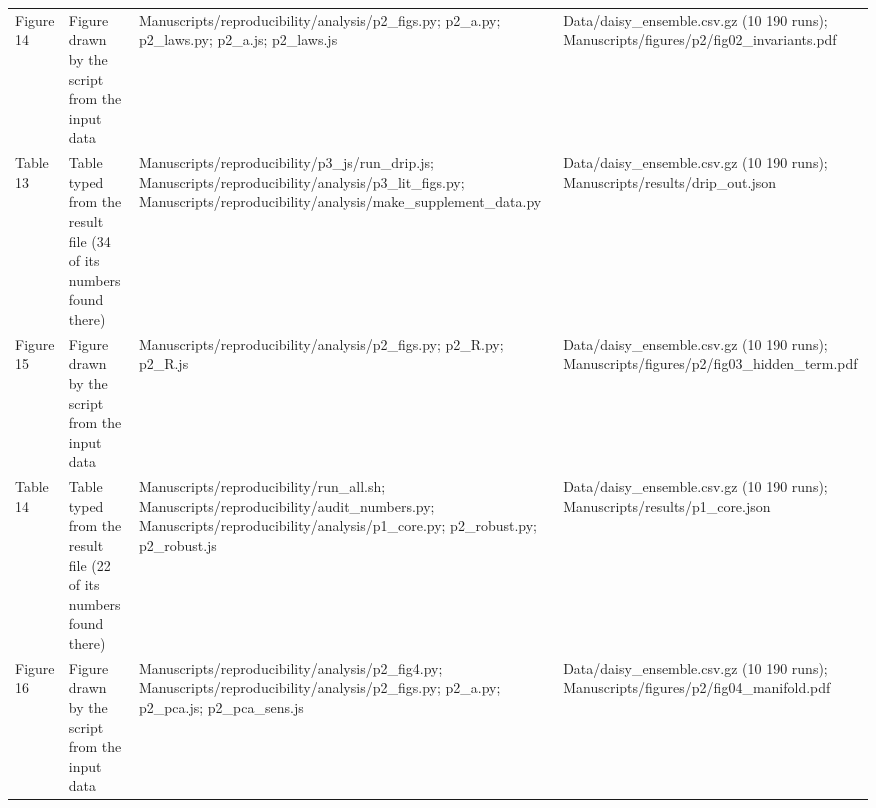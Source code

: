 {\begin{longtable}{p{}p{}p{}p{}}
{}Figure 14 & Figure drawn by the script from the input data & Manuscripts/\allowbreak{}reproducibility/\allowbreak{}analysis/\allowbreak{}p2\_\allowbreak{}figs.py;  p2\_\allowbreak{}a.py;  p2\_\allowbreak{}laws.py;  p2\_\allowbreak{}a.js;  p2\_\allowbreak{}laws.js & Data/\allowbreak{}daisy\_\allowbreak{}ensemble.csv.gz (10 190 runs);  Manuscripts/\allowbreak{}figures/\allowbreak{}p2/\allowbreak{}fig02\_\allowbreak{}invariants.pdf\\
{}Table 13 & Table typed from the result file (34 of its numbers found there) & Manuscripts/\allowbreak{}reproducibility/\allowbreak{}p3\_\allowbreak{}js/\allowbreak{}run\_\allowbreak{}drip.js;  Manuscripts/\allowbreak{}reproducibility/\allowbreak{}analysis/\allowbreak{}p3\_\allowbreak{}lit\_\allowbreak{}figs.py;  Manuscripts/\allowbreak{}reproducibility/\allowbreak{}analysis/\allowbreak{}make\_\allowbreak{}supplement\_\allowbreak{}data.py & Data/\allowbreak{}daisy\_\allowbreak{}ensemble.csv.gz (10 190 runs);  Manuscripts/\allowbreak{}results/\allowbreak{}drip\_\allowbreak{}out.json\\
{}Figure 15 & Figure drawn by the script from the input data & Manuscripts/\allowbreak{}reproducibility/\allowbreak{}analysis/\allowbreak{}p2\_\allowbreak{}figs.py;  p2\_\allowbreak{}R.py;  p2\_\allowbreak{}R.js & Data/\allowbreak{}daisy\_\allowbreak{}ensemble.csv.gz (10 190 runs);  Manuscripts/\allowbreak{}figures/\allowbreak{}p2/\allowbreak{}fig03\_\allowbreak{}hidden\_\allowbreak{}term.pdf\\
{}Table 14 & Table typed from the result file (22 of its numbers found there) & Manuscripts/\allowbreak{}reproducibility/\allowbreak{}run\_\allowbreak{}all.sh;  Manuscripts/\allowbreak{}reproducibility/\allowbreak{}audit\_\allowbreak{}numbers.py;  Manuscripts/\allowbreak{}reproducibility/\allowbreak{}analysis/\allowbreak{}p1\_\allowbreak{}core.py;  p2\_\allowbreak{}robust.py;  p2\_\allowbreak{}robust.js & Data/\allowbreak{}daisy\_\allowbreak{}ensemble.csv.gz (10 190 runs);  Manuscripts/\allowbreak{}results/\allowbreak{}p1\_\allowbreak{}core.json\\
{}Figure 16 & Figure drawn by the script from the input data & Manuscripts/\allowbreak{}reproducibility/\allowbreak{}analysis/\allowbreak{}p2\_\allowbreak{}fig4.py;  Manuscripts/\allowbreak{}reproducibility/\allowbreak{}analysis/\allowbreak{}p2\_\allowbreak{}figs.py;  p2\_\allowbreak{}a.py;  p2\_\allowbreak{}pca.js;  p2\_\allowbreak{}pca\_\allowbreak{}sens.js & Data/\allowbreak{}daisy\_\allowbreak{}ensemble.csv.gz (10 190 runs);  Manuscripts/\allowbreak{}figures/\allowbreak{}p2/\allowbreak{}fig04\_\allowbreak{}manifold.pdf\\

\end{longtable}}
